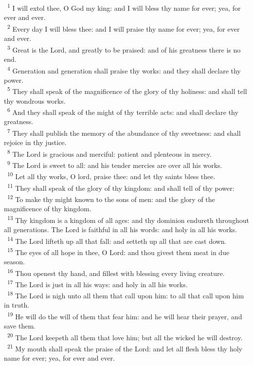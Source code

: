 \documentclass[a5paper,12pt]{article}
\begin{document}
\begin{multicols*}{2}
~\textsuperscript{1} I will extol thee, O God my king: and I will bless thy name for ever; yea, for ever and ever.\\
~\textsuperscript{2} Every day I will bless thee: and I will praise thy name for ever; yea, for ever and ever.\\
~\textsuperscript{3} Great is the Lord, and greatly to be praised: and of his greatness there is no end.\\
~\textsuperscript{4} Generation and generation shall praise thy works: and they shall declare thy power.\\
~\textsuperscript{5} They shall speak of the magnificence of the glory of thy holiness: and shall tell thy wondrous works.\\
~\textsuperscript{6} And they shall speak of the might of thy terrible acts: and shall declare thy greatness.\\
~\textsuperscript{7} They shall publish the memory of the abundance of thy sweetness: and shall rejoice in thy justice.\\
~\textsuperscript{8} The Lord is gracious and merciful: patient and plenteous in mercy.\\
~\textsuperscript{9} The Lord is sweet to all: and his tender mercies are over all his works.\\
~\textsuperscript{10} Let all thy works, O lord, praise thee: and let thy saints bless thee.\\
~\textsuperscript{11} They shall speak of the glory of thy kingdom: and shall tell of thy power:\\
~\textsuperscript{12} To make thy might known to the sons of men: and the glory of the magnificence of thy kingdom.\\
~\textsuperscript{13} Thy kingdom is a kingdom of all ages: and thy dominion endureth throughout all generations. The Lord is faithful in all his words: and holy in all his works.\\
~\textsuperscript{14} The Lord lifteth up all that fall: and setteth up all that are cast down.\\
~\textsuperscript{15} The eyes of all hope in thee, O Lord: and thou givest them meat in due season.\\
~\textsuperscript{16} Thou openest thy hand, and fillest with blessing every living creature.\\
~\textsuperscript{17} The Lord is just in all his ways: and holy in all his works.\\
~\textsuperscript{18} The Lord is nigh unto all them that call upon him: to all that call upon him in truth.\\
~\textsuperscript{19} He will do the will of them that fear him: and he will hear their prayer, and save them.\\
~\textsuperscript{20} The Lord keepeth all them that love him; but all the wicked he will destroy.\\
~\textsuperscript{21} My mouth shall speak the praise of the Lord: and let all flesh bless thy holy name for ever; yea, for ever and ever.\\


\end{multicols*}
\end{document}
